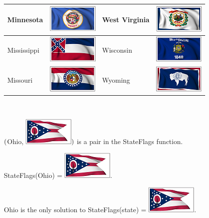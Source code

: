 \documentclass{ximera}
\begin{document}
\begin{center}
\begin{tabular}{|l|l|l|l|}
Minnesota & \includegraphics{pics/StateFlags/Minnesota.png} & West Virginia & \includegraphics{pics/StateFlags/WestVirginia.png} \\\hline 
Mississippi & \includegraphics{pics/StateFlags/Mississippi.png} & Wisconsin & \includegraphics{pics/StateFlags/Wisconsin.png} \\\hline 
Missouri & \includegraphics{pics/StateFlags/Missouri.png} & Wyoming & \includegraphics{pics/StateFlags/Wyoming.png} \\\hline 
\end{tabular}



\end{center}

\quad \\



\begin{example}

$\Large{(}$Ohio, \includegraphics{pics/StateFlags/Ohio.png}$\Large{)}$ is a pair in the StateFlags function.

StateFlags(Ohio) = \includegraphics{pics/StateFlags/Ohio.png}.

Ohio is the only solution to StateFlags(state) = \includegraphics{pics/StateFlags/Ohio.png}.

\end{example}
\end{document}
